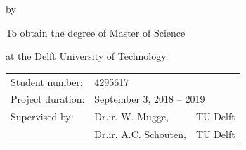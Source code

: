 \begin{titlepage}


\begin{center}


{\makeatletter
\largetitlestyle\fontsize{48}{68}\selectfont\@title
\makeatother}


\bigskip
\bigskip

by

\bigskip
\bigskip

{\makeatletter
\largetitlestyle\fontsize{26}{26}\selectfont\@author
\makeatother}

\bigskip
\bigskip

To obtain the degree of Master of Science

at the Delft University of Technology.


\vfill

\begin{tabular}{lll}
    Student number: & 4295617 \\
    Project duration: & \multicolumn{2}{l}{September 3, 2018 -- 2019} \\
    Supervised by: & Dr.ir. W. Mugge, & TU Delft \\
        & Dr.ir. A.C. Schouten, & TU Delft \\
\end{tabular}


\bigskip
\bigskip


\end{center}
\end{titlepage}
